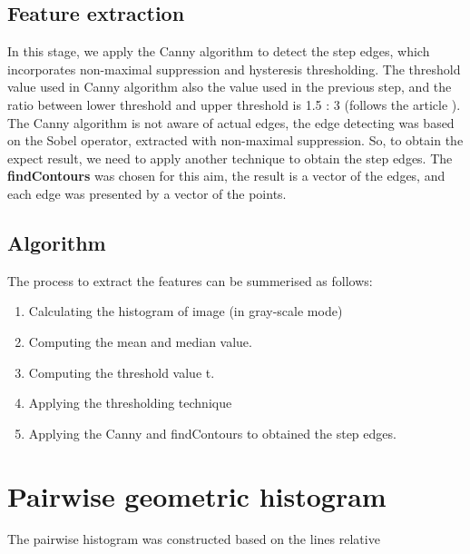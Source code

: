 \subsection{Feature extraction}
In this stage, we apply the Canny algorithm to detect the step edges, which incorporates non-maximal suppression and hysteresis thresholding. The threshold value used in Canny algorithm also the value used in the previous step, and the ratio between lower threshold and upper threshold is 1.5 : 3 (follows the article \cite{palaniswamy2010automatic}).\\
The Canny algorithm is not aware of actual edges, the edge detecting was based on the Sobel operator, extracted with non-maximal suppression. So, to obtain the expect result, we  need to apply another technique to obtain the step edges. The \textbf{findContours} was chosen for this aim, the result is a vector of the edges, and each edge was presented by a vector of the points.

\subsection{Algorithm}
The process to extract the features can be summerised as follows:
\begin{enumerate}
\item Calculating the histogram of image (in gray-scale mode)
\item Computing the mean and median value.
\item Computing the threshold value t.
\item Applying the thresholding technique
\item Applying the Canny and findContours to obtained the step edges.
\end{enumerate}
\section{Pairwise geometric histogram}
The pairwise histogram was constructed based on the lines relative
